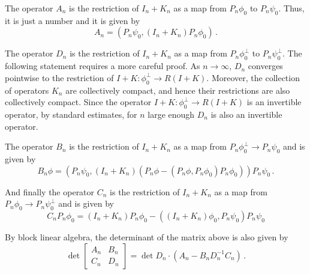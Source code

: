 The operator $A_{n}$
is the restriction of $I_{n} + K_{n}$ as a map from $P_{n} \phi_{0}$ 
to $P_{n} \psi_{0}$. Thus, it is just a number and it is given by
\begin{equation}
A_{n} = \left(P_{n} \psi_{0}, (I_{n} + K_{n}) P_{n} \phi_{0} \right) \,.
\end{equation}

The operator $D_{n}$ is the restriction of $I_{n} + K_{n}$ 
as a map from $P_{n} \phi_{0}^{\perp}$ 
to $P_{n} \psi_{0}^{\perp}$.
The following statement requires a more careful proof.
{\color{red} As $n \to \infty$, $D_{n}$ converges pointwise to the restriction
of $I + K: \phi_{0}^{\perp} \to R(I+K)$. Moreover, the collection
of operators $K_{n}$ are collectively compact, and hence their restrictions
are also collectively compact. 
Since the operator $I+K: \phi_{0}^{\perp} \to R(I+K)$ is an invertible
operator, by standard estimates, for $n$ large enough $D_{n}$ is also 
an invertible operator.}

The operator $B_{n}$ is the restriction of $I_{n} + K_{n}$ as a map from 
$P_{n} \phi_{0} ^{\perp} \to P_{n} \psi_{0}$ and is given by
\begin{equation}
B_{n} \phi = \left( P_{n} \psi_{0}, (I_{n} + K_{n}) 
(P_{n} \phi -( P_{n} \phi, P_{n} \phi_{0}) P_{n} \phi_{0}) \right) P_{n} \psi_{0}  \, .
\end{equation}

And finally the operator $C_{n}$ is the restriction of $I_{n} + K_{n}$ as a map from
$P_{n} \phi_{0} \to P_{n} \psi_{0}^{\perp}$ and is given by
\begin{equation}
C_{n}P_{n} \phi_{0} = (I_{n} + K_{n}) P_{n} \phi_{0} - \left( (I_{n} + K_{n}) \phi_{0}, P_{n} \psi_{0} \right)P_{n} \psi_{0}
\end{equation}


By block linear algebra, the determinant of the matrix above is also given by
\begin{equation}
\det{
\begin{bmatrix}
A_{n} & B_{n} \\
C_{n} & D_{n} 
\end{bmatrix} 
}
= \det{D_{n}} \cdot (A_{n} - B_{n} D_{n}^{-1} C_{n}) \,.
\end{equation}

